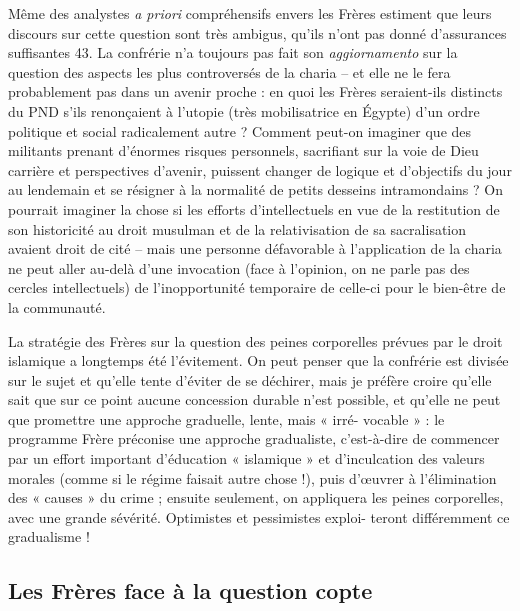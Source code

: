  
Même des analystes \emph{a priori} compréhensifs envers les Frères
estiment que leurs discours sur cette question sont très ambigus, qu'ils
n'ont pas donné d'assurances suffisantes 43. La confrérie n'a toujours
pas fait son \emph{aggiornamento} sur la question des aspects les plus
controversés de la charia -- et elle ne le fera probablement pas dans un
avenir proche : en quoi les Frères seraient-ils distincts du PND s'ils
renonçaient à l'utopie (très mobilisatrice en Égypte) d'un ordre
politique et social radicalement autre ? Comment peut-on imaginer
que des militants prenant d'énormes risques personnels, sacrifiant sur
la voie de Dieu carrière et perspectives d'avenir, puissent changer de
logique et d'objectifs du jour au lendemain et se résigner à la
normalité de petits desseins intramondains ? On pourrait imaginer la
chose si les efforts d'intellectuels en vue de la restitution de son
historicité au droit musulman et de la relativisation de sa
sacralisation avaient droit de cité -- mais une personne défavorable à
l'application de la charia ne peut aller au-delà d'une invocation (face
à l'opinion, on ne parle pas des cercles intellectuels) de
l'inopportunité temporaire de celle-ci pour le bien-être de la
communauté.

La stratégie des Frères sur la question des peines corporelles prévues
par le droit islamique a longtemps été l'évitement. On peut penser que
la confrérie est divisée sur le sujet et qu'elle tente d'éviter de se
déchirer, mais je préfère croire qu'elle sait que sur ce point aucune
concession durable n'est possible, et qu'elle ne peut que promettre une
approche graduelle, lente, mais « irré- vocable » : le programme Frère
préconise une approche gradualiste, c'est-à-dire de commencer par un
effort important d'éducation « islamique » et d'inculcation des valeurs
morales (comme si le régime faisait autre chose !), puis d'œuvrer à
l'élimination des « causes » du crime ; ensuite seulement, on appliquera
les peines corporelles, avec une grande sévérité. Optimistes et
pessimistes exploi- teront différemment ce gradualisme !
 

\hypertarget{les-fruxe8res-face-uxe0-la-question-copte}{%
\subsection{Les Frères face à la question
copte}\label{les-fruxe8res-face-uxe0-la-question-copte}}

